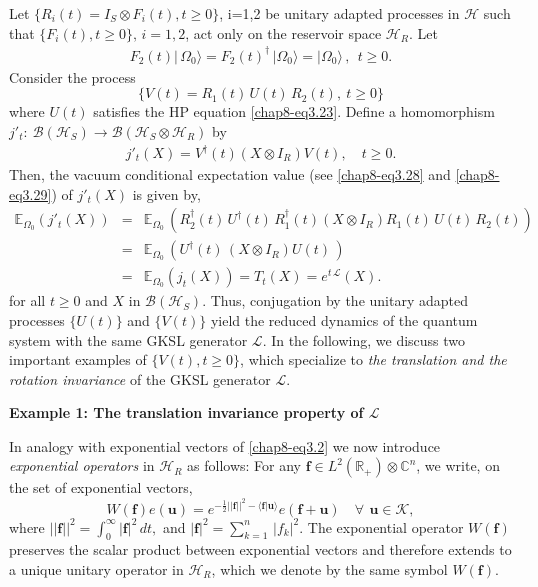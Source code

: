 Let $\{R_i(t)=I_S\otimes F_i(t), t\geq 0\}$, i=1,2  be unitary adapted processes in $\mathcal{H}$ such that  $\{F_i(t), t\geq 0\},\, i=1,2$, act only on the reservoir space $\mathcal{H}_R$. Let 
\begin{eqnarray}
F_2(t)\vert\, \Omega_0\rangle=F_2(t)^\dag\,\vert \Omega_0\rangle=\vert\Omega_0\rangle\, ,\ \ t\geq 0. \label{chap8-eq4.1}
\end{eqnarray}
Consider the process 
\begin{equation}
\{V(t)=R_1(t)\, U(t)\, R_2(t),\  t\geq 0\} \label{chap8-eq4.2}
\end{equation} 
where  $U(t)$ satisfies the HP equation \eqref{chap8-eq3.23}. Define a homomorphism $j'_t:  \ \mathcal{B}(\mathcal{H}_S)\longrightarrow \mathcal{B}(\mathcal{H}_S\otimes\mathcal{H}_R)$ by 
\begin{eqnarray}
j'_t (X) = V^{\dagger}(t) (X \otimes I_R)  V(t), \quad t \ge 0.   \label{chap8-eq4.3}
\end{eqnarray}
Then, the vacuum conditional expectation value (see \eqref{chap8-eq3.28} and \eqref{chap8-eq3.29}) of $j'_{t}(X)$ is given by, 
\begin{eqnarray}
\mathbb{E}_{\Omega_0} \left(j'_t(X)\right) &=& \mathbb{E}_{\Omega_0}\, \left(R^{\dagger}_2(t)\, U^\dag(t)\, R^\dag_1(t) (X \otimes I_R)  R_1(t)\, U(t)\, R_2(t)\right)\nonumber \\
&=& \mathbb{E}_{\Omega_0}\,\left( U^\dag(t)\,  (X \otimes I_R)  U(t)\, \right)\nonumber\\
&=&\mathbb{E}_{\Omega_0} \left(j_t(X)\right)=T_t(X) =e^{t\,\mathcal{L}}(X).   \label{chap8-eq4.4}
\end{eqnarray} 
for all $t\geq 0$ and $X$ in $\mathcal{B}(\mathcal{H}_S)$. Thus, conjugation by the unitary adapted processes $\{U(t)\}$ and $\{V(t)\}$ yield the reduced dynamics of the quantum system with  the same GKSL generator $\mathcal{L}$. 
In the following, we discuss two important examples of $\{V(t), t\geq 0\}$, which specialize to {\em the  translation  and the rotation invariance} of the GKSL generator $\mathcal{L}$. 
\bigskip

\noindent \textbf{\large{Example 1:  The translation invariance property of $\mathcal{L}$}} 
\bigskip

In analogy with exponential vectors of \eqref{chap8-eq3.2} we now introduce {\it exponential operators}  in $\mathcal{H}_R$ as follows:  For any $\mathbf{f}\in L^2(\mathbb{R}_+)\otimes \mathbb{C}^n$, we write, on the set of exponential vectors, 
\begin{equation}
W(\mathbf{f}) e(\mathbf{u}) = e^{-\frac{1}{2} ||\mathbf{f}||^{2} - \langle \mathbf{f}|\mathbf{u} \rangle} e (\mathbf{f}+\mathbf{u}) \quad \forall\, \ \mathbf{u}\in\mathcal{K},      \label{chap8-eq4.5}
\end{equation} 
where $\vert\vert\mathbf{f}\vert\vert^{2}=\int_0^{\infty} \vert \mathbf{f}\vert^2\, dt,$ and $\vert \mathbf{f}\vert^2= \sum_{k=1}^{n}\,\vert  f_k\vert^2$.  The exponential operator $W(\mathbf{f})$ preserves the scalar product between exponential vectors and therefore extends to a unique unitary operator in $\mathcal{H}_R$, which we denote by the same symbol $W(\mathbf{f})$. 

